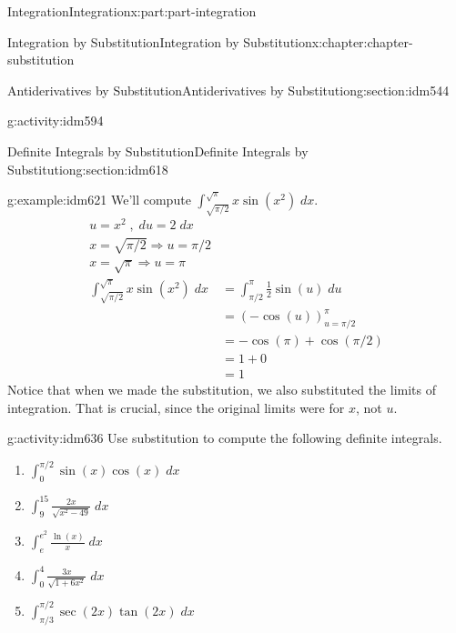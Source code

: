 \documentclass[oneside,10pt,]{book}
\numberwithin{equation}{section}
\newcommand{\amp}{&}
\begin{document}
\begin{partptx}{Integration}{}{Integration}{}{}{x:part:part-integration}
\begin{chapterptx}{Integration by Substitution}{}{Integration by Substitution}{}{}{x:chapter:chapter-substitution}
\begin{sectionptx}{Antiderivatives by Substitution}{}{Antiderivatives by Substitution}{}{}{g:section:idm544}
\begin{activity}{}{g:activity:idm594}
\end{activity}
\end{sectionptx}
%
%
\typeout{************************************************}
\typeout{************************************************}
%
\begin{sectionptx}{Definite Integrals by Substitution}{}{Definite Integrals by Substitution}{}{}{g:section:idm618}
%
\begin{example}{}{g:example:idm621}%
We'll compute \(\displaystyle \int_{\sqrt{\pi/2}}^{\sqrt{\pi}} x\sin(x^2)\;dx\).%
%
\begin{align*}
u = x^2 \;,\; du = 2\;dx\\
x = \sqrt{\pi/2} \Rightarrow u = \pi/2\\
x = \sqrt{\pi}  \Rightarrow u = \pi\\
\int_{\sqrt{\pi/2}}^{\sqrt{\pi}} x\sin(x^2)\;dx \amp = \int_{\pi/2}^\pi \frac{1}{2}\sin(u)\;du\\
\amp = \left(-\cos(u)\right)_{u=\pi/2}^{\pi}\\
\amp = -\cos(\pi) + \cos(\pi/2)\\
\amp = 1 + 0\\
\amp = 1
\end{align*}
Notice that when we made the substitution, we also substituted the limits of integration. That is crucial, since the original limits were for \(x\), not \(u\).%
\end{example}
\begin{activity}{}{g:activity:idm636}%
Use substitution to compute the following definite integrals.\begin{enumerate}[font=\bfseries,label=(\alph*),ref=\alph*]
\item{}\(\displaystyle \int_{0}^{\pi/2} \sin(x)\cos(x) \; dx\)\item{}\(\displaystyle \int_{9}^{15} \frac{2x}{\sqrt{x^2-49}} \; dx\)\item{}\(\displaystyle \int_{e}^{e^2} \frac{\ln(x)}{x}\; dx\)\item{}\(\displaystyle \int_{0}^{4} \frac{3x}{\sqrt{1+6x^2}} \; dx\)\item{}\(\displaystyle \int_{\pi/3}^{\pi/2} \sec(2x) \tan(2x) \; dx\)\end{enumerate}
\end{activity}
\end{sectionptx}
\end{chapterptx}
\end{partptx}
\end{document}
